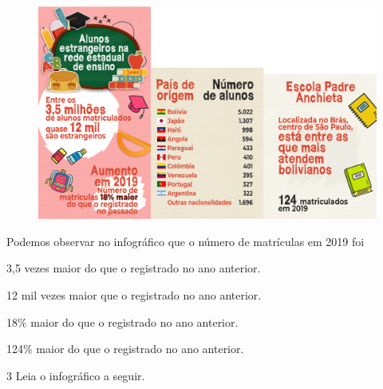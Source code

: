 \begin{conteudo}
\begin{conteudo}
\begin{conteudo}
\begin{conteudo}
\begin{conteudo}
\begin{figure}[htpb!]
\centering
\includegraphics[width=\textwidth]{media/image33.jpeg}
\end{figure}


Podemos observar no infográfico que o número de matrículas em 2019 foi

\begin{escolha}
\item 3,5 vezes maior do que o registrado no ano anterior.

\item 12 mil vezes maior que o registrado no ano anterior.

\item 18\% maior do que o registrado no ano anterior.

\item 124\% maior do que o registrado no ano anterior.

\end{escolha}

\pagebreak
\num{3} Leia o infográfico a seguir.


\end{conteudo}
\end{conteudo}
\end{conteudo}
\end{conteudo}
\end{conteudo}

